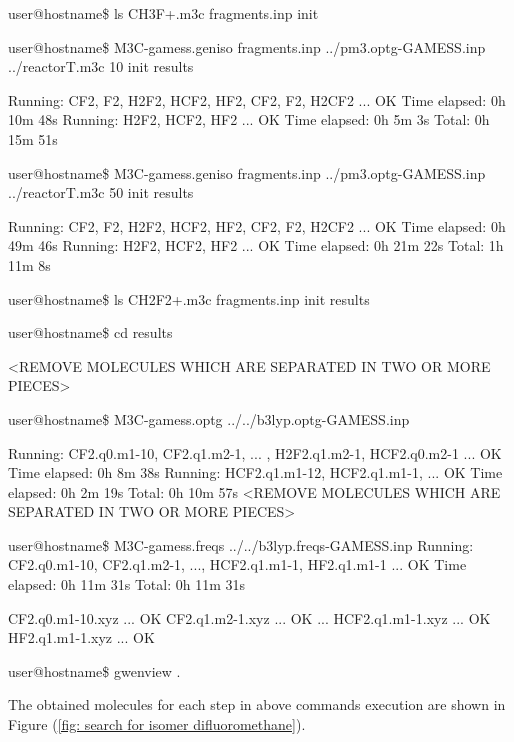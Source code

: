 \documentclass[a4paper,12pt]{article}
\begin{document}
\begin{shellexec}
user@hostname\$ ls
CH3F+.m3c  fragments.inp  init

user@hostname\$ M3C-gamess.geniso fragments.inp ../pm3.optg-GAMESS.inp ../reactorT.m3c 10 init results

Running:    CF2,    F2,  H2F2,  HCF2,   HF2,   CF2,    F2, H2CF2 ... OK     Time elapsed: 0h 10m 48s
Running:   H2F2,  HCF2,   HF2                                    ... OK     Time elapsed: 0h 5m 3s                 
                                                                                   Total: 0h 15m 51s

user@hostname\$ M3C-gamess.geniso fragments.inp ../pm3.optg-GAMESS.inp ../reactorT.m3c 50 init results

Running:    CF2,    F2,  H2F2,  HCF2,   HF2,   CF2,    F2, H2CF2 ... OK     Time elapsed: 0h 49m 46s
Running:   H2F2,  HCF2,   HF2                                    ... OK     Time elapsed: 0h 21m 22s
                                                                                   Total: 1h 11m 8s

user@hostname\$ ls
CH2F2+.m3c  fragments.inp  init  results

user@hostname\$ cd results

<REMOVE MOLECULES WHICH ARE SEPARATED IN TWO OR MORE PIECES>

user@hostname\$ M3C-gamess.optg ../../b3lyp.optg-GAMESS.inp

Running:  CF2.q0.m1-10,  CF2.q1.m2-1,  ... , H2F2.q1.m2-1, HCF2.q0.m2-1 ... OK   Time elapsed: 0h 8m 38s
Running: HCF2.q1.m1-12, HCF2.q1.m1-1,                                   ... OK   Time elapsed: 0h 2m 19s
                                                                                        Total: 0h 10m 57s
<REMOVE MOLECULES WHICH ARE SEPARATED IN TWO OR MORE PIECES>

user@hostname\$ M3C-gamess.freqs ../../b3lyp.freqs-GAMESS.inp
Running:  CF2.q0.m1-10,  CF2.q1.m2-1,   ..., HCF2.q1.m1-1,  HF2.q1.m1-1 ... OK   Time elapsed: 0h 11m 31s
                                                                                        Total: 0h 11m 31s

CF2.q0.m1-10.xyz ... OK
CF2.q1.m2-1.xyz ... OK
...
HCF2.q1.m1-1.xyz ... OK
HF2.q1.m1-1.xyz ... OK

user@hostname\$ gwenview .
\end{shellexec}
The obtained molecules for each step in above commands execution are shown in Figure (\ref{fig: search for isomer difluoromethane}).
\end{document}
